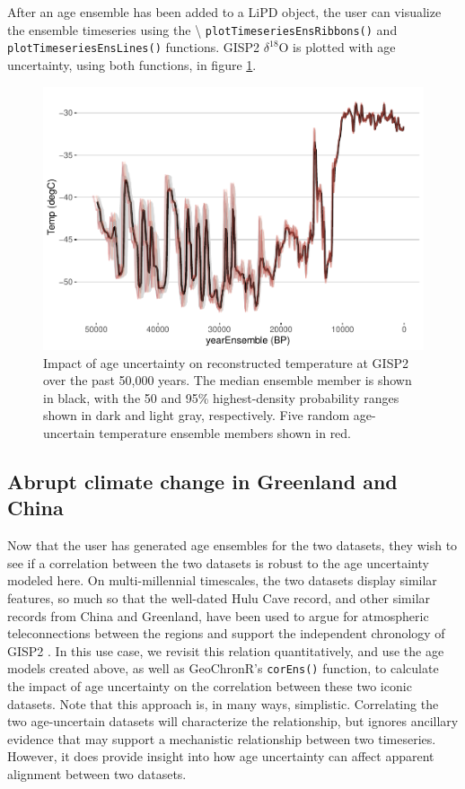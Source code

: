 \documentclass[gchron, manuscript]{copernicus}
\begin{document}
After an age ensemble has been added to a LiPD object, the user can visualize the ensemble timeseries using the \textbackslash{} \texttt{plotTimeseriesEnsRibbons()} and \texttt{plotTimeseriesEnsLines()} functions.
GISP2 \(\delta^{18}\)O is plotted with age uncertainty, using both functions, in figure \ref{fig:timeseries}.

\begin{figure}
\includegraphics[width=12cm]{geoChronR-paper_files/figure-latex/timeseries-1} \caption{Impact of age uncertainty on reconstructed temperature at GISP2 over the past 50,000 years. The median ensemble member is shown in black, with the 50 and 95\% highest-density probability ranges shown in dark and light gray, respectively. Five random age-uncertain temperature ensemble members shown in red.}\label{fig:timeseries}
\end{figure}

\subsection{Abrupt climate change in Greenland and China}

Now that the user has generated age ensembles for the two datasets, they wish to see if a correlation between the two datasets is robust to the age uncertainty modeled here.
On multi-millennial timescales, the two datasets display similar features, so much so that the well-dated Hulu Cave record, and other similar records from China and Greenland, have been used to argue for atmospheric teleconnections between the regions and support the independent chronology of GISP2 \citep{hulu2001}.
In this use case, we revisit this relation quantitatively, and use the age models created above, as well as GeoChronR's \texttt{corEns()} function, to calculate the impact of age uncertainty on the correlation between these two iconic datasets.
Note that this approach is, in many ways, simplistic.
Correlating the two age-uncertain datasets will characterize the relationship, but ignores ancillary evidence that may support a mechanistic relationship between two timeseries. However, it does provide insight into how age uncertainty can affect apparent alignment between two datasets.
\end{document}
